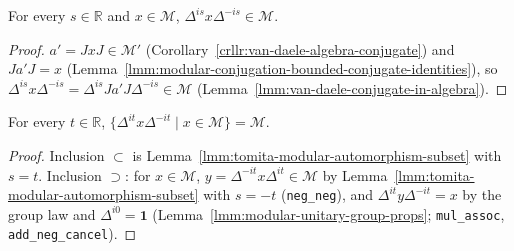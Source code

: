 \begin{lemma}
    \label{lmm:tomita-modular-automorphism-subset}
    \leanok
    For every $s \in \mathbb{R}$ and $x \in \mathcal{M}$, $\Delta^{is}x\Delta^{-is} \in \mathcal{M}$.
\end{lemma}
\begin{proof}
    \leanok
    $a' = JxJ \in \mathcal{M}'$ (Corollary~\ref{crllr:van-daele-algebra-conjugate}) and $Ja'J = x$ (Lemma~\ref{lmm:modular-conjugation-bounded-conjugate-identities}), so $\Delta^{is}x\Delta^{-is} = \Delta^{is}Ja'J\Delta^{-is} \in \mathcal{M}$ (Lemma~\ref{lmm:van-daele-conjugate-in-algebra}).
\end{proof}

\begin{lemma}[$\Delta^{it}\mathcal{M}\Delta^{-it} = \mathcal{M}$]
    \label{lmm:tomita-modular-automorphism}
    \leanok
    For every $t \in \mathbb{R}$, $\{ \Delta^{it}x\Delta^{-it} \mid x \in \mathcal{M} \} = \mathcal{M}$.
\end{lemma}
\begin{proof}
    \leanok
    Inclusion $\subset$ is Lemma~\ref{lmm:tomita-modular-automorphism-subset} with $s = t$. Inclusion $\supset$: for $x \in \mathcal{M}$, $y = \Delta^{-it}x\Delta^{it} \in \mathcal{M}$ by Lemma~\ref{lmm:tomita-modular-automorphism-subset} with $s = -t$ (\texttt{neg\_neg}), and $\Delta^{it}y\Delta^{-it} = x$ by the group law and $\Delta^{i0} = \mathbf{1}$ (Lemma~\ref{lmm:modular-unitary-group-props}; \texttt{mul\_assoc}, \texttt{add\_neg\_cancel}).
\end{proof}

